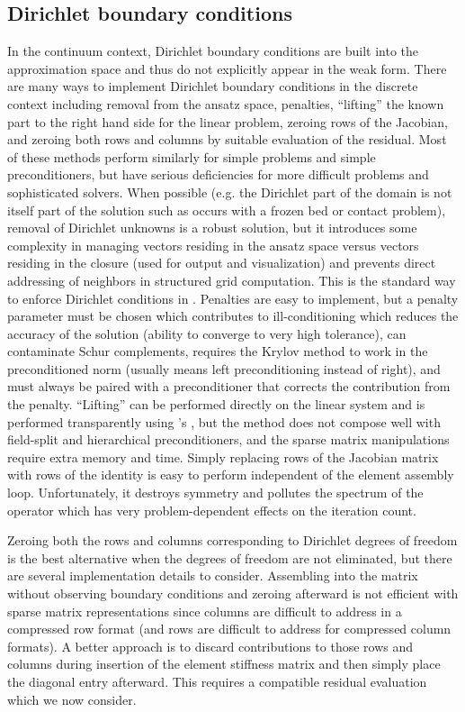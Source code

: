 \subsection{Dirichlet boundary conditions}\label{ssec:implementation-dirichlet}
In the continuum context, Dirichlet boundary conditions are built into the approximation space and thus do not explicitly appear in the weak form.
There are many ways to implement Dirichlet boundary conditions in the discrete context including removal from the ansatz space, penalties, ``lifting'' the known part to the right hand side for the linear problem, zeroing rows of the Jacobian, and zeroing both rows and columns by suitable evaluation of the residual.
Most of these methods perform similarly for simple problems and simple preconditioners, but have serious deficiencies for more difficult problems and sophisticated solvers.
When possible (e.g. the Dirichlet part of the domain is not itself part of the solution such as occurs with a frozen bed or contact problem), removal of Dirichlet unknowns is a robust solution, but it introduces some complexity in managing vectors residing in the ansatz space versus vectors residing in the closure (used for output and visualization) and prevents direct addressing of neighbors in structured grid computation.
This is the standard way to enforce Dirichlet conditions in \Dohp.
Penalties are easy to implement, but a penalty parameter must be chosen which contributes to ill-conditioning which reduces the accuracy of the solution (ability to converge to very high tolerance), can contaminate Schur complements, requires the Krylov method to work in the preconditioned norm (usually means left preconditioning instead of right), and must always be paired with a preconditioner that corrects the contribution from the penalty.
``Lifting'' can be performed directly on the linear system and is performed transparently using \PETSc's , but the method does not compose well with field-split and hierarchical preconditioners, and the sparse matrix manipulations require extra memory and time.
Simply replacing rows of the Jacobian matrix with rows of the identity is easy to perform independent of the element assembly loop.
Unfortunately, it destroys symmetry and pollutes the spectrum of the operator which has very problem-dependent effects on the iteration count.

Zeroing both the rows and columns corresponding to Dirichlet degrees of freedom is the best alternative when the degrees of freedom are not eliminated, but there are several implementation details to consider.
Assembling into the matrix without observing boundary conditions and zeroing afterward is not efficient with sparse matrix representations since columns are difficult to address in a compressed row format (and rows are difficult to address for compressed column formats).
A better approach is to discard contributions to those rows and columns during insertion of the element stiffness matrix and then simply place the diagonal entry afterward.
This requires a compatible residual evaluation which we now consider.

